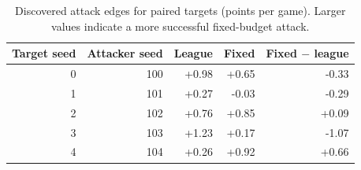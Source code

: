 \begin{table}[t]
\centering
\caption{Discovered attack edges for paired targets (points per game). Larger values indicate a more successful fixed-budget attack.}
\label{tab:robustness}
\begin{tabular}{rrrrr}
\toprule
Target seed & Attacker seed & League & Fixed & Fixed $-$ league \\
\midrule
0 & 100 & +0.98 & +0.65 & -0.33 \\
1 & 101 & +0.27 & -0.03 & -0.29 \\
2 & 102 & +0.76 & +0.85 & +0.09 \\
3 & 103 & +1.23 & +0.17 & -1.07 \\
4 & 104 & +0.26 & +0.92 & +0.66 \\
\bottomrule
\end{tabular}
\end{table}
